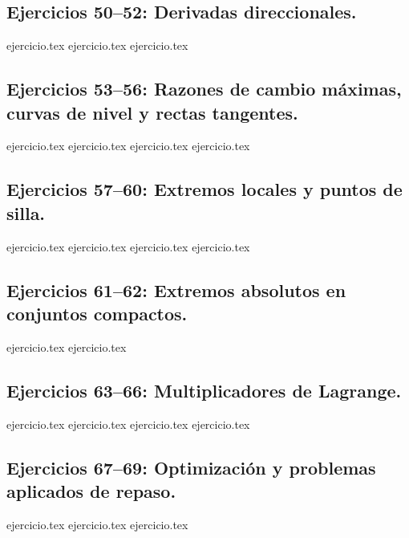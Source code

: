 \subsection*{Ejercicios 50--52: Derivadas direccionales.}
\begin{enumerate}
    \setcounter{enumi}{49}
    {ejercicio.tex}
    {ejercicio.tex}
    {ejercicio.tex}
\end{enumerate}

\subsection*{Ejercicios 53--56: Razones de cambio máximas, curvas de nivel y rectas tangentes.}
\begin{enumerate}
    \setcounter{enumi}{52}
    {ejercicio.tex}
    {ejercicio.tex}
    {ejercicio.tex}
    {ejercicio.tex}
\end{enumerate}

\subsection*{Ejercicios 57--60: Extremos locales y puntos de silla.}
\begin{enumerate}
    \setcounter{enumi}{56}
    {ejercicio.tex}
    {ejercicio.tex}
    {ejercicio.tex}
    {ejercicio.tex}
\end{enumerate}

\subsection*{Ejercicios 61--62: Extremos absolutos en conjuntos compactos.}
\begin{enumerate}
    \setcounter{enumi}{60}
    {ejercicio.tex}
    {ejercicio.tex}
\end{enumerate}

\subsection*{Ejercicios 63--66: Multiplicadores de Lagrange.}
\begin{enumerate}
    \setcounter{enumi}{62}
    {ejercicio.tex}
    {ejercicio.tex}
    {ejercicio.tex}
    {ejercicio.tex}
\end{enumerate}

\subsection*{Ejercicios 67--69: Optimización y problemas aplicados de repaso.}
\begin{enumerate}
    \setcounter{enumi}{66}
    {ejercicio.tex}
    {ejercicio.tex}
    {ejercicio.tex}
\end{enumerate}
